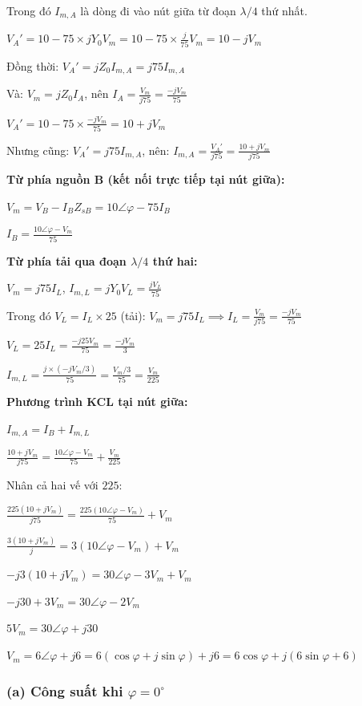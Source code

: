 \documentclass[12pt,a4paper]{article}
\begin{document}
Trong đó $I_{m,A}$ là dòng đi vào nút giữa từ đoạn $\lambda/4$ thứ nhất.

$V_A' = 10 - 75 \times jY_0 V_m = 10 - 75 \times \frac{j}{75} V_m = 10 - jV_m$

Đồng thời: $V_A' = jZ_0 I_{m,A} = j75 I_{m,A}$

Và: $V_m = jZ_0 I_A$, nên $I_A = \frac{V_m}{j75} = \frac{-jV_m}{75}$

$V_A' = 10 - 75 \times \frac{-jV_m}{75} = 10 + jV_m$

Nhưng cũng: $V_A' = j75 I_{m,A}$, nên: $I_{m,A} = \frac{V_A'}{j75} = \frac{10 + jV_m}{j75}$

\textbf{Từ phía nguồn B (kết nối trực tiếp tại nút giữa):}

$V_m = V_B - I_B Z_{sB} = 10\angle\varphi - 75 I_B$

$I_B = \frac{10\angle\varphi - V_m}{75}$

\textbf{Từ phía tải qua đoạn $\lambda/4$ thứ hai:}

$V_m = j75 I_L$, $I_{m,L} = jY_0 V_L = \frac{jV_L}{75}$

Trong đó $V_L = I_L \times 25$ (tải):
$V_m = j75 I_L \implies I_L = \frac{V_m}{j75} = \frac{-jV_m}{75}$

$V_L = 25 I_L = \frac{-j25V_m}{75} = \frac{-jV_m}{3}$

$I_{m,L} = \frac{j \times (-jV_m/3)}{75} = \frac{V_m/3}{75} = \frac{V_m}{225}$

\textbf{Phương trình KCL tại nút giữa:}

$I_{m,A} = I_B + I_{m,L}$

$\frac{10 + jV_m}{j75} = \frac{10\angle\varphi - V_m}{75} + \frac{V_m}{225}$

Nhân cả hai vế với $225$:

$\frac{225(10 + jV_m)}{j75} = \frac{225(10\angle\varphi - V_m)}{75} + V_m$

$\frac{3(10 + jV_m)}{j} = 3(10\angle\varphi - V_m) + V_m$

$-j3(10 + jV_m) = 30\angle\varphi - 3V_m + V_m$

$-j30 + 3V_m = 30\angle\varphi - 2V_m$

$5V_m = 30\angle\varphi + j30$

$V_m = 6\angle\varphi + j6 = 6(\cos\varphi + j\sin\varphi) + j6 = 6\cos\varphi + j(6\sin\varphi + 6)$

\subsubsection{(a) Công suất khi $\varphi = 0^\circ$}
\end{document}
